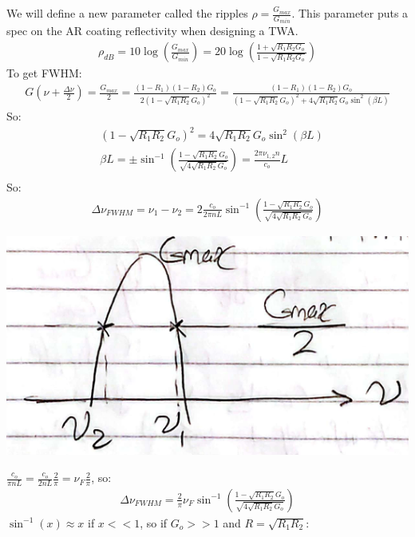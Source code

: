 \documentclass[11pt]{article}
\begin{document}
We will define a new parameter called the ripples $\rho = \frac{G_{max}}{G_{min}}$. This parameter puts a spec on the AR coating reflectivity when designing a TWA.
\begin{align*}
    \rho_{dB} = 10 \log \left(\frac{G_{max}}{G_{min}}\right) = 20 \log \left(\frac{1 + \sqrt{R_1 R_2 G_o}}{1 - \sqrt{R_1 R_2 G_o}}\right)
\end{align*}
To get FWHM:
\begin{align*}
    G \left(\nu + \frac{\Delta \nu}{2}\right) = \frac{G_{max}}{2} = \frac{(1-R_1) (1-R_2) G_o}{2(1 - \sqrt{R_1 R_2} G_o)^2} = \frac{(1-R_1) (1-R_2) G_o}{(1 - \sqrt{R_1 R_2} G_o)^2 + 4 \sqrt{R_1 R_2} G_o \sin^2(\beta L)}
\end{align*}
So:
\begin{align*}
    & (1 - \sqrt{R_1 R_2} G_o)^2 = 4 \sqrt{R_1 R_2} G_o \sin^2(\beta L) \\
    & \beta L = \pm \sin^{-1}\left(\frac{1 - \sqrt{R_1 R_2} G_o}{\sqrt{4 \sqrt{R_1 R_2} G_o}} \right) = \frac{2 \pi \nu_{1,2} n}{c_o}L \\
\end{align*}
So:
\begin{align*}
    \Delta \nu_{FWHM} = \nu_1 - \nu_2 = 2 \frac{c_o}{2 \pi n L} \sin^{-1}\left(\frac{1 - \sqrt{R_1 R_2} G_o}{\sqrt{4 \sqrt{R_1 R_2} G_o}} \right)
\end{align*}
\begin{center}
    \includegraphics[scale=0.8]{4.png}
\end{center}
$\frac{c_o}{\pi n L} = \frac{c_o}{2 n L} \frac{2}{\pi} = \nu_F \frac{2}{\pi}$, so:
\begin{align*}
    \Delta \nu_{FWHM} = \frac{2}{\pi} \nu_F \sin^{-1}\left(\frac{1 - \sqrt{R_1 R_2} G_o}{\sqrt{4 \sqrt{R_1 R_2} G_o}} \right)
\end{align*}
$\sin^{-1}(x) \approx x$ if $x << 1$, so if $G_o >> 1$ and $R = \sqrt{R_1 R_2}$:
\end{document}
